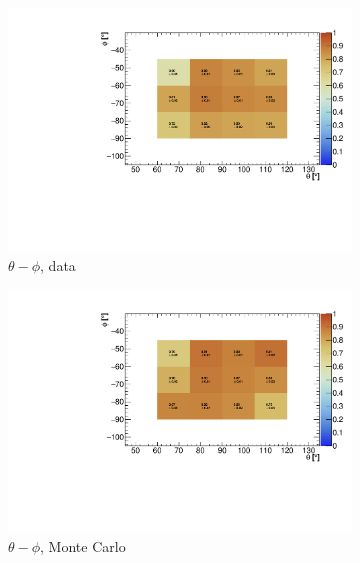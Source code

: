 \documentclass[a4paper]{scrartcl}
\begin{document}
\begin{figure}[htbp]
  \begin{center}
    \begin{subfigure}{0.52\textwidth}
      \includegraphics[width=\linewidth]{figures/theta_phi_data.pdf}
      \caption{$\theta - \phi$, data} \label{fig:2d_cry}
    \end{subfigure}\begin{subfigure}{0.52\textwidth}
    \includegraphics[width=\linewidth]{figures/theta_phi_mc.pdf}
    \caption{$\theta - \phi$, Monte Carlo}\label{fig:2d_cry_mc}
  \end{subfigure}
  \begin{subfigure}{0.52\textwidth}

\end{subfigure}
\end{center}
\end{figure}
\end{document}
